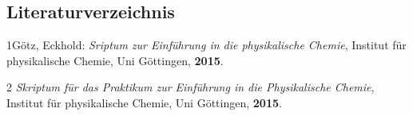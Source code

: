 \documentclass[12pt,a4paper,titlepage,headinclude,bibtotoc]{scrartcl}
\begin{document}
 


















\subsection{Literaturverzeichnis}
1\quad Götz, Eckhold: \emph{Sriptum zur Einführung in die physikalische Chemie}, Institut für physikalische Chemie, Uni Göttingen, \textbf{2015}.

\vspace{0,5 cm}

2 \quad \emph{Skriptum für das Praktikum zur Einführung in die Physikalische Chemie}, Institut für physikalische Chemie, Uni Göttingen, \textbf{2015}.\\
\end{document}
